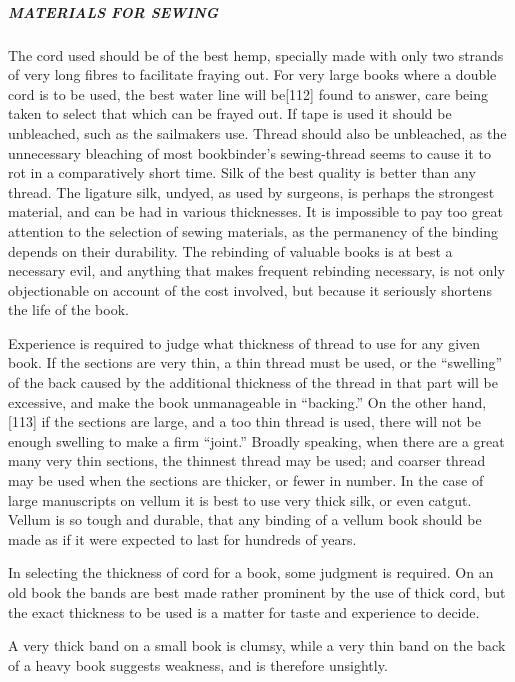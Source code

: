 \documentclass[
]{article}
\begin{document}
\hypertarget{materials-for-sewing}{%
\subparagraph{MATERIALS FOR SEWING}\label{materials-for-sewing}}

The cord used should be of the best hemp, specially made with only two
strands of very long fibres to facilitate fraying out. For very large
books where a double cord is to be used, the best water line will
be{\protect\hypertarget{Page_112}{}{{[}112{]}}} found to answer, care
being taken to select that which can be frayed out. If tape is used it
should be unbleached, such as the sailmakers use. Thread should also be
unbleached, as the unnecessary bleaching of most bookbinder's
sewing-thread seems to cause it to rot in a comparatively short time.
Silk of the best quality is better than any thread. The ligature silk,
undyed, as used by surgeons, is perhaps the strongest material, and can
be had in various thicknesses. It is impossible to pay too great
attention to the selection of sewing materials, as the permanency of the
binding depends on their durability. The rebinding of valuable books is
at best a necessary evil, and anything that makes frequent rebinding
necessary, is not only objectionable on account of the cost involved,
but because it seriously shortens the life of the book.

Experience is required to judge what thickness of thread to use for any
given book. If the sections are very thin, a thin thread must be used,
or the ``swelling'' of the back caused by the additional thickness of
the thread in that part will be excessive, and make the book
unmanageable in ``backing.'' On the other
hand,{\protect\hypertarget{Page_113}{}{{[}113{]}}} if the sections are
large, and a too thin thread is used, there will not be enough swelling
to make a firm ``joint.'' Broadly speaking, when there are a great many
very thin sections, the thinnest thread may be used; and coarser thread
may be used when the sections are thicker, or fewer in number. In the
case of large manuscripts on vellum it is best to use very thick silk,
or even catgut. Vellum is so tough and durable, that any binding of a
vellum book should be made as if it were expected to last for hundreds
of years.

In selecting the thickness of cord for a book, some judgment is
required. On an old book the bands are best made rather prominent by the
use of thick cord, but the exact thickness to be used is a matter for
taste and experience to decide.

A very thick band on a small book is clumsy, while a very thin band on
the back of a heavy book suggests weakness, and is therefore unsightly.
\end{document}
